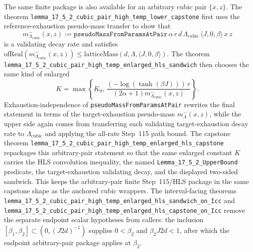 \documentclass[a4paper,11pt]{article}
\begin{document}
The same finite package is also available for an arbitrary cubic pair
\(\{x,z\}\).  The theorem
\texttt{lemma\_17\_5\_2\_cubic\_pair\_high\_temp\_lower\_capstone} first uses
the reference-exhaustion pseudo-mass transfer to show that
\[
  m^-_{\Lambda_{\mathrm{cubic}}}(x,z)
  := \texttt{pseudoMassFromParamsAtPair}\,
      \alpha\,r\,d\,\Lambda_{\mathrm{cubic}}\,
      \langle J,0,\beta\rangle\,x\,z
\]
is a validating decay rate and satisfies
\(\mathrm{ofReal}(m^-_{\Lambda_{\mathrm{cubic}}}(x,z)) \le
\mathrm{latticeMass}(d,\Lambda,\langle J,0,\beta\rangle)\).  The theorem
\texttt{lemma\_17\_5\_2\_cubic\_pair\_high\_temp\_enlarged\_hls\_sandwich}
then chooses the same kind of enlarged
\[
  K=\max\left\{K_0,\,
    \frac{(-\log(\tanh(\beta J)))\,r}
         {(2\alpha+1)m^-_{\Lambda_{\mathrm{cubic}}}(x,z)}\right\}.
\]
Exhaustion-independence of
\texttt{pseudoMassFromParamsAtPair} rewrites the final statement in terms of
the target-exhaustion pseudo-mass
\(m^-_{\Lambda}(x,z)\), while the upper side again comes from transferring
each validating target-exhaustion decay rate to \(\Lambda_{\mathrm{cubic}}\)
and applying the all-rate Step~115 path bound.
The capstone theorem
\texttt{lemma\_17\_5\_2\_cubic\_pair\_high\_temp\_enlarged\_hls\_capstone}
repackages this arbitrary-pair statement so that the same enlarged constant
\(K\) carries the HLS convolution inequality, the named
\texttt{Lemma\_17\_5\_2\_UpperBound} predicate, the target-exhaustion
validating decay, and the displayed two-sided sandwich.  This keeps the
arbitrary-pair finite Step~115/HLS package in the same capstone shape as the
anchored cubic wrappers.
The interval-facing theorems
\texttt{lemma\_17\_5\_2\_cubic\_pair\_high\_temp\_enlarged\_hls\_sandwich\_on\_Icc}
and
\texttt{lemma\_17\_5\_2\_cubic\_pair\_high\_temp\_enlarged\_hls\_capstone\_on\_Icc}
remove the separate endpoint scalar hypotheses from callers: the inclusion
\([\beta_1,\beta_2]\subset (0,(J2d)^{-1})\) supplies \(0<\beta_2\) and
\(\beta_2J2d<1\), after which the endpoint arbitrary-pair package applies at
\(\beta_2\).
\end{document}
